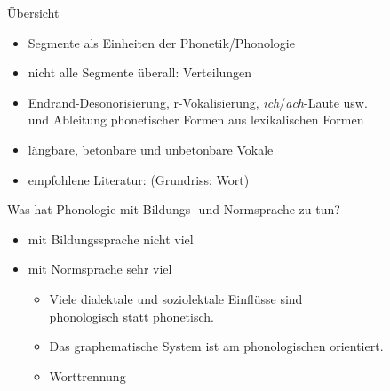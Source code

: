 \begin{frame}
  {Übersicht}
  \pause
  \begin{itemize}[<+->]
    \item \alert{Segmente} als Einheiten der Phonetik\slash Phonologie
    \item nicht alle Segmente überall: \alert{Verteilungen}
    \item Endrand-Desonorisierung, r-Vokalisierung, \textit{ich}\slash\textit{ach}-Laute usw.\\
      und \alert{Ableitung} phonetischer Formen aus lexikalischen Formen
    \item längbare, betonbare und unbetonbare Vokale
      \Zeile
    \item empfohlene Literatur: \citet{Eisenberg2013a} (Grundriss: Wort)
  \end{itemize}
\end{frame}

\begin{frame}
  {Was hat Phonologie mit Bildungs- und Normsprache zu tun?}
  \pause
  \begin{itemize}[<+->]
    \item mit Bildungssprache nicht viel
    \item mit Normsprache sehr viel
      \begin{itemize}[<+->]
        \item Viele dialektale und soziolektale Einflüsse sind\\
          phonologisch statt phonetisch.
        \item Das graphematische System ist am phonologischen orientiert.
        \item Worttrennung
      \end{itemize}
  \end{itemize}
\end{frame}

